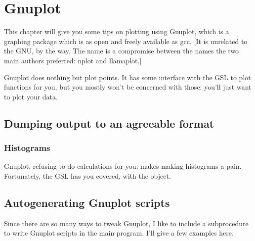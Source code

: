 \chapter{Gnuplot} \label{gnuplot}

This chapter will give you some tips on plotting using Gnuplot, which is a graphing package which is as
open and freely available as gcc. [It is unrelated to the GNU, by the way. The name is a compromise
between the names the two main authors preferred: nplot and llamaplot.]

Gnuplot does nothing but plot points. It has some interface with the GSL to plot functions for you, but
you mostly won't be concerned with those: you'll just want to plot your data.


\section{Dumping output to an agreeable format} 

\subsection{Histograms} Gnuplot, refusing to do calculations for you, makes making histograms a pain.
Fortunately, the GSL has you covered, with the  object.

\section{Autogenerating Gnuplot scripts} 
Since there are so many ways to tweak Gnuplot, I like to include a subprocedure to write Gnuplot scripts
in the main program. I'll give a few examples here.

